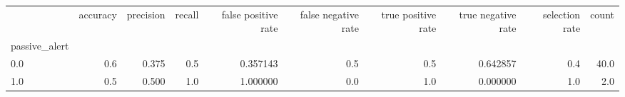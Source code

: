 \begin{tabular}{lrrrrrrrrr}
\toprule
{} &  accuracy &  precision &  recall &  false positive rate &  false negative rate &  true positive rate &  true negative rate &  selection rate &  count \\
passive\_alert &           &            &         &                      &                      &                     &                     &                 &        \\
\midrule
0.0           &       0.6 &      0.375 &     0.5 &             0.357143 &                  0.5 &                 0.5 &            0.642857 &             0.4 &   40.0 \\
1.0           &       0.5 &      0.500 &     1.0 &             1.000000 &                  0.0 &                 1.0 &            0.000000 &             1.0 &    2.0 \\
\bottomrule
\end{tabular}
